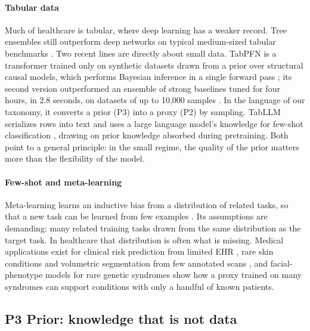 \documentclass[acmsmall,screen,review]{acmart}
\theoremstyle{acmdefinition}
\begin{document}
\paragraph{Tabular data} Much of healthcare is tabular, where deep learning has a weaker record. Tree ensembles still outperform deep networks on typical medium-sized tabular benchmarks \cite{grinsztajn2022do}. Two recent lines are directly about small data. TabPFN is a transformer trained only on synthetic datasets drawn from a prior over structural causal models, which performs Bayesian inference in a single forward pass \cite{hollmann2023tabpfn}; its second version outperformed an ensemble of strong baselines tuned for four hours, in 2.8 seconds, on datasets of up to 10,000 samples \cite{hollmann2025accurate}. In the language of our taxonomy, it converts a prior (P3) into a proxy (P2)
 by sampling. TabLLM serializes rows into text and uses a large language model’s knowledge for few-shot classification \cite{hegselmann2023tabllm}, drawing on prior knowledge absorbed during pretraining. Both point to a general principle: in the small regime, the quality of the prior matters more than the flexibility of the model.

\paragraph{Few-shot and meta-learning} Meta-learning learns an inductive bias from a distribution of related tasks, so that a new task can be learned from few examples \cite{baxter2000model,finn2017model,hospedales2022meta,snell2017prototypical,wang2020generalizing}. Its assumptions are demanding: many related training tasks drawn from the same distribution as the target task. In healthcare that distribution is often what is missing. Medical applications exist for clinical risk prediction from limited EHR \cite{zhang2019metapred}, rare skin conditions \cite{mahajan2020meta,prabhu2019few} and volumetric segmentation from few annotated scans \cite{roy2020squeeze}, and facial-phenotype models for rare genetic syndromes \cite{gurovich2019identifying,hsieh2022gestaltmatcher} show how a proxy trained on many syndromes can support conditions with only a handful of known patients.

\subsection{P3 Prior: knowledge that is not data}\label{sec:S6_3}
\end{document}
